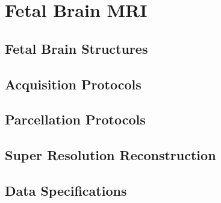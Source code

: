 \chapter{Fetal Brain MRI} \label{chap:FetalBrainMRI}
\vspace{1cm}



\section{Fetal Brain Structures}

\section{Acquisition Protocols}

\section{Parcellation Protocols}

\section{Super Resolution Reconstruction}

\section{Data Specifications}
